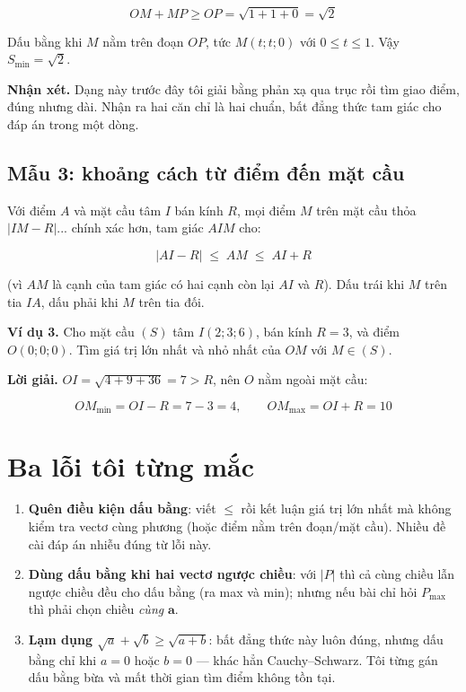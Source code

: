 \documentclass[12pt,a4paper]{article}
\begin{document}
$$
OM + MP \ge OP = \sqrt{1+1+0} = \sqrt{2}
$$

Dấu bằng khi $M$ nằm trên đoạn $OP$, tức $M(t;t;0)$ với $0 \le t \le 1$. Vậy $S_{\min} = \sqrt{2}$.

\textbf{Nhận xét.} Dạng này trước đây tôi giải bằng phản xạ qua trục rồi tìm giao điểm, đúng nhưng dài. Nhận ra hai căn chỉ là hai chuẩn, bất đẳng thức tam giác cho đáp án trong một dòng.

\subsection*{Mẫu 3: khoảng cách từ điểm đến mặt cầu}

Với điểm $A$ và mặt cầu tâm $I$ bán kính $R$, mọi điểm $M$ trên mặt cầu thỏa $|IM - R|$... chính xác hơn, tam giác $AIM$ cho:

$$
|AI - R| \;\le\; AM \;\le\; AI + R
$$

(vì $AM$ là cạnh của tam giác có hai cạnh còn lại $AI$ và $R$). Dấu trái khi $M$ trên tia $IA$, dấu phải khi $M$ trên tia đối.

\textbf{Ví dụ 3.} Cho mặt cầu $(S)$ tâm $I(2;3;6)$, bán kính $R=3$, và điểm $O(0;0;0)$. Tìm giá trị lớn nhất và nhỏ nhất của $OM$ với $M \in (S)$.

\textbf{Lời giải.} $OI = \sqrt{4+9+36} = 7 > R$, nên $O$ nằm ngoài mặt cầu:

$$
OM_{\min} = OI - R = 7-3 = 4,
\qquad
OM_{\max} = OI + R = 10
$$

\section{Ba lỗi tôi từng mắc}

\begin{enumerate}
  \item \textbf{Quên điều kiện dấu bằng}: viết $\le$ rồi kết luận giá trị lớn nhất mà không kiểm tra vectơ cùng phương (hoặc điểm nằm trên đoạn/mặt cầu). Nhiều đề cài đáp án nhiễu đúng từ lỗi này.
  \item \textbf{Dùng dấu bằng khi hai vectơ ngược chiều}: với $|P|$ thì cả cùng chiều lẫn ngược chiều đều cho dấu bằng (ra max và min); nhưng nếu bài chỉ hỏi $P_{\max}$ thì phải chọn chiều \emph{cùng} $\mathbf{a}$.
  \item \textbf{Lạm dụng $\sqrt{a}+\sqrt{b} \ge \sqrt{a+b}$}: bất đẳng thức này luôn đúng, nhưng dấu bằng chỉ khi $a=0$ hoặc $b=0$ --- khác hẳn Cauchy--Schwarz. Tôi từng gán dấu bằng bừa và mất thời gian tìm điểm không tồn tại.
\end{enumerate}
\end{document}
